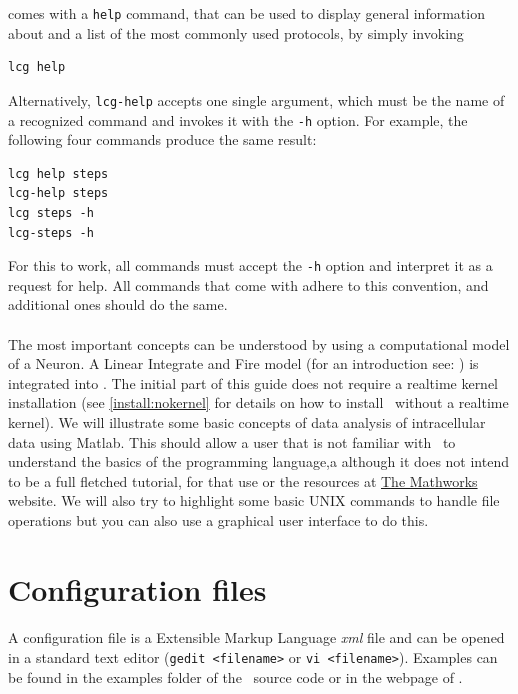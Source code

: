 \progname comes with a \verb+help+ command, that can be used to
display general information about \progname and a list of the most
commonly used protocols, by simply invoking
\begin{lstlisting}
lcg help
\end{lstlisting}
Alternatively, \verb+lcg-help+ accepts one single argument,
which must be the name of a recognized command and invokes it with
the \verb+-h+ option. For example, the following four commands
produce the same result:
\begin{lstlisting}
lcg help steps
lcg-help steps
lcg steps -h
lcg-steps -h
\end{lstlisting}
For this to work, all commands must accept the \verb+-h+ option
and interpret it as a request for help. All commands that come with
\progname adhere to this convention, and additional ones should
do the same.

\paragraph{}
The most important concepts can be understood by using a computational
model of a Neuron. A Linear Integrate and Fire model (for an
introduction see: \cite{Koch:1989}) is integrated into \progname. The
initial part of this guide does not require a realtime kernel
installation (see \ref{install:nokernel} for details on how to install
\progname\ without a realtime kernel).
We will illustrate some basic concepts of data analysis of
intracellular data using Matlab. This should allow a user that is not
familiar with \matlab\ to understand the basics of the programming
language,a although it does not intend to be a full fletched tutorial,
for that use \cite{wallisch2011} or the resources at
\href{http://www.mathworks.com}{The Mathworks} website. We will also
try to highlight some basic UNIX commands to handle file operations
but you can also use a graphical user interface to do this. 

\section{Configuration files}
\paragraph{}
A configuration file is a Extensible Markup Language \emph{xml} file
and can be opened in a standard text editor (\texttt{gedit <filename>}
or \texttt{vi <filename>}). Examples can be found in the examples
folder of the \progname\ source code or in the webpage of
\href{http://www.tnb.ua.ac.be}{\progname}.

